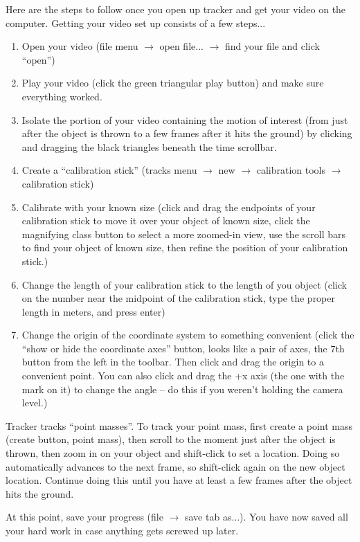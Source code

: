 \documentclass{handout}
\begin{document}
Here are the steps to follow once you open up tracker and get your video on the computer. Getting your video set up consists of a few steps...
\begin{enumerate}
    \item Open your video (file menu $\to$ open file... $\to$ find your file and click “open”)
    \item Play your video (click the green triangular play button) and make sure
everything worked.
\item Isolate the portion of your video containing the motion of interest (from
just after the object is thrown to a few frames after it hits the ground)
by clicking and dragging the black triangles beneath the time scrollbar.
\item Create a “calibration stick” (tracks menu $\to$ new $\to$ calibration tools $\to$
calibration stick)
\item Calibrate with your known size (click and drag the endpoints of your
calibration stick to move it over your object of known size, click the
magnifying class button to select a more zoomed-in view, use the scroll
bars to find your object of known size, then refine the position of your
calibration stick.)
\item Change the length of your calibration stick to the length of you object
(click on the number near the midpoint of the calibration stick, type
the proper length in meters, and press enter)
\item Change the origin of the coordinate system to something convenient
(click the “show or hide the coordinate axes” button, looks like a pair
of axes, the 7th button from the left in the toolbar. Then click and drag
the origin to a convenient point. You can also click and drag the +x
axis (the one with the mark on it) to change the angle – do this if you
weren’t holding the camera level.)
\end{enumerate}
Tracker tracks “point masses”. To track your point mass, first create a point
mass (create button, point mass), then scroll to the moment just after the
object is thrown, then zoom in on your object and shift-click to set a location.
Doing so automatically advances to the next frame, so shift-click again on the
new object location. Continue doing this until you have at least a few frames
after the object hits the ground.

At this point, save your progress (file $\to$ save tab as...). You have now saved
all your hard work in case anything gets screwed up later.
\end{document}
